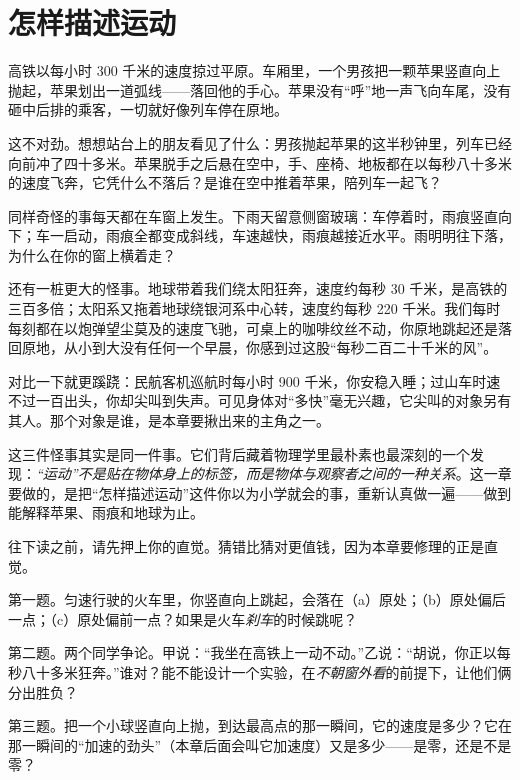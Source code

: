\chapter{怎样描述运动}


\begin{mainline}
高铁以每小时 300 千米的速度掠过平原。车厢里，一个男孩把一颗苹果竖直向上抛起，苹果划出一道弧线——落回他的手心。苹果没有“呼”地一声飞向车尾，没有砸中后排的乘客，一切就好像列车停在原地。

这不对劲。想想站台上的朋友看见了什么：男孩抛起苹果的这半秒钟里，列车已经向前冲了四十多米。苹果脱手之后悬在空中，手、座椅、地板都在以每秒八十多米的速度飞奔，它凭什么不落后？是谁在空中推着苹果，陪列车一起飞？

同样奇怪的事每天都在车窗上发生。下雨天留意侧窗玻璃：车停着时，雨痕竖直向下；车一启动，雨痕全都变成斜线，车速越快，雨痕越接近水平。雨明明往下落，为什么在你的窗上横着走？

还有一桩更大的怪事。地球带着我们绕太阳狂奔，速度约每秒 30 千米，是高铁的三百多倍；太阳系又拖着地球绕银河系中心转，速度约每秒 220 千米。我们每时每刻都在以炮弹望尘莫及的速度飞驰，可桌上的咖啡纹丝不动，你原地跳起还是落回原地，从小到大没有任何一个早晨，你感到过这股“每秒二百二十千米的风”。

对比一下就更蹊跷：民航客机巡航时每小时 900 千米，你安稳入睡；过山车时速不过一百出头，你却尖叫到失声。可见身体对“多快”毫无兴趣，它尖叫的对象另有其人。那个对象是谁，是本章要揪出来的主角之一。

这三件怪事其实是同一件事。它们背后藏着物理学里最朴素也最深刻的一个发现：\emph{“运动”不是贴在物体身上的标签，而是物体与观察者之间的一种关系}。这一章要做的，是把“怎样描述运动”这件你以为小学就会的事，重新认真做一遍——做到能解释苹果、雨痕和地球为止。
\end{mainline}


往下读之前，请先押上你的直觉。猜错比猜对更值钱，因为本章要修理的正是直觉。

第一题。匀速行驶的火车里，你竖直向上跳起，会落在（a）原处；（b）原处偏后一点；（c）原处偏前一点？如果是火车\emph{刹车}的时候跳呢？

第二题。两个同学争论。甲说：“我坐在高铁上一动不动。”乙说：“胡说，你正以每秒八十多米狂奔。”谁对？能不能设计一个实验，在\emph{不朝窗外看}的前提下，让他们俩分出胜负？

第三题。把一个小球竖直向上抛，到达最高点的那一瞬间，它的速度是多少？它在那一瞬间的“加速的劲头”（本章后面会叫它加速度）又是多少——是零，还是不是零？

